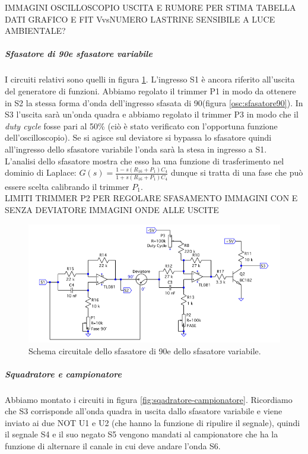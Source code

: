 \documentclass[10pt,a4paper]{article}
\begin{document}
IMMAGINI OSCILLOSCOPIO USCITA E RUMORE PER STIMA
TABELLA DATI
GRAFICO E FIT VvsNUMERO LASTRINE
SENSIBILE A LUCE AMBIENTALE?

\subparagraph{Sfasatore di 90\degree e sfasatore variabile}
I circuiti relativi sono quelli in figura \ref{fig:sfasatori}. L'ingresso S1 è ancora riferito all'uscita del generatore di funzioni. Abbiamo regolato il trimmer P1 in modo da ottenere in S2 la stessa forma d'onda dell'ingresso sfasata di 90\degree (figura \ref{osc:sfasatore90}). In S3 l'uscita sarà un'onda quadra e abbiamo regolato il trimmer P3 in modo che il \emph{duty cycle} fosse pari al 50\% (ciò è stato verificato con l'opportuna funzione dell'oscilloscopio). Se si agisce sul deviatore si bypassa lo sfasatore quindi all'ingresso dello sfasatore variabile l'onda sarà la stesa in ingresso a S1.\\
L'analisi dello sfasatore mostra che esso ha una funzione di trasferimento nel dominio di Laplace: $G(s) = \frac{1-s(R_{16} +P_1) C_{4}}{1+s(R_{16} + P_1)C_{4}}$ dunque si tratta di una fase che può essere scelta calibrando il trimmer $P_1$.\\


LIMITI TRIMMER P2 PER REGOLARE SFASAMENTO
IMMAGINI CON E SENZA DEVIATORE
IMMAGINI ONDE ALLE USCITE

\begin{figure}[!htb]
  \centering
  \includegraphics[scale=0.75]{sfasatori.png}
\caption{Schema circuitale dello sfasatore di 90\degree e dello sfasatore variabile.\label{fig:sfasatori}}
\end{figure}


\subparagraph{Squadratore e campionatore}
Abbiamo montato i circuiti in figura \ref{fig:sqadratore-campionatore}. Ricordiamo che S3 corrisponde all'onda quadra in uscita dallo sfasatore variabile e viene inviato ai due NOT U1 e U2 (che hanno la funzione di ripulire il segnale), quindi il segnale S4 e il suo negato S5 vengono mandati al campionatore che ha la funzione di alternare il canale in cui deve andare l'onda S6.
\end{document}
